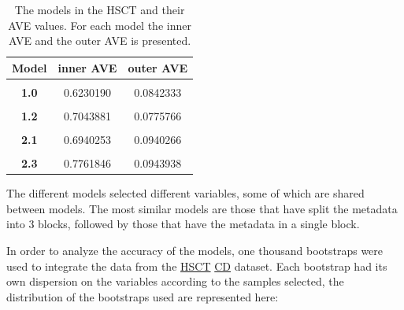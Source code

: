 \documentclass[
  12pt,
  a4paper,
  twoside,
  openright]{book}
\begin{document}
\begin{table}[H]

\caption[The models in the HSCT dataset and their AVE values.]{\label{tab:hsct-models-ave}The models in the HSCT and their AVE values. For each model the inner AVE and the outer AVE is presented.}
\centering
\begin{tabular}[t]{>{}c|c|c}
\hline
\textbf{Model} & \textbf{inner AVE} & \textbf{outer AVE}\\
\hline
\textbf{\cellcolor{gray!6}{0.0}} & \cellcolor{gray!6}{0.3999234} & \cellcolor{gray!6}{0.1001689}\\
\hline
\textbf{1.0} & 0.6230190 & 0.0842333\\
\hline
\textbf{\cellcolor{gray!6}{1.1}} & \cellcolor{gray!6}{0.5678189} & \cellcolor{gray!6}{0.0848714}\\
\hline
\textbf{1.2} & 0.7043881 & 0.0775766\\
\hline
\textbf{\cellcolor{gray!6}{2.0}} & \cellcolor{gray!6}{0.2517363} & \cellcolor{gray!6}{0.0982050}\\
\hline
\textbf{2.1} & 0.6940253 & 0.0940266\\
\hline
\textbf{\cellcolor{gray!6}{2.2}} & \cellcolor{gray!6}{0.8187640} & \cellcolor{gray!6}{0.0941628}\\
\hline
\textbf{2.3} & 0.7761846 & 0.0943938\\
\hline
\end{tabular}
\end{table}

The different models selected different variables, some of which are shared between models.
The most similar models are those that have split the metadata into 3 blocks, followed by those that have the metadata in a single block.

In order to analyze the accuracy of the models, one thousand bootstraps were used to integrate the data from the \protect\hyperlink{acronyms_HSCT}{HSCT} \protect\hyperlink{acronyms_CD}{CD} dataset.
Each bootstrap had its own dispersion on the variables according to the samples selected, the distribution of the bootstraps used are represented here:
\end{document}

